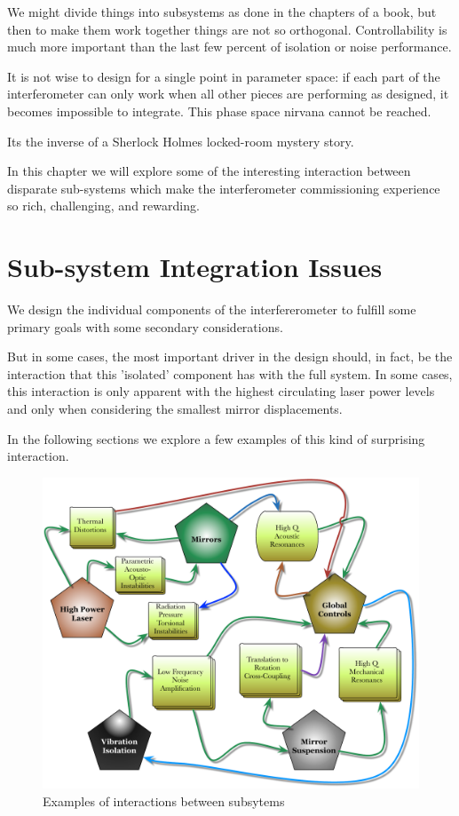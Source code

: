 We might divide things into subsystems as done in the chapters of a book,
but then to make them work together things are not so orthogonal.
Controllability is much more important than the last few percent of
isolation or noise performance.

It is not wise to design for a single point in parameter space: if each
part of the interferometer can only work when all other pieces are
performing as designed, it becomes impossible to integrate. This phase
space nirvana cannot be reached.

Its the inverse of a Sherlock Holmes locked-room mystery story.

In this chapter we will explore some of the interesting interaction between
disparate sub-systems which make the interferometer commissioning experience
so rich, challenging, and rewarding.


\section{Sub-system Integration Issues}
We design the individual components of the interfererometer to fulfill some
primary goals with some secondary considerations.

But in some cases, the most important driver in the design should, in fact, be the
interaction that this 'isolated' component has with the full system. In some cases,
this interaction is only apparent with the highest circulating laser power levels
and only when considering the smallest mirror displacements.

In the following sections we explore a few examples of this kind of surprising
interaction.


\begin{figure}[h]
\centering
\includegraphics[width=\columnwidth]{Figures/SystemConflicts.pdf}
\caption{Examples of interactions between subsytems}
\label{fig:SystemConflicts}
\end{figure}

